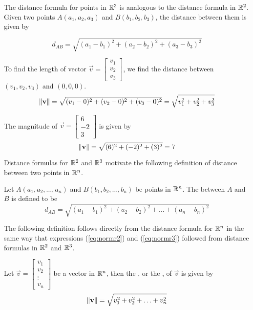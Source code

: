 \documentclass{ximera}
\begin{document}
The distance formula for points in $\mathbb{R}^3$ is analogous to the distance formula in $\mathbb{R}^2$.  Given two points $A(a_1, a_2, a_3)$ and $B(b_1, b_2, b_3)$, the distance between them is given by 

\begin{equation*}
d_{AB}=\sqrt{(a_1-b_1)^2+(a_2-b_2)^2+(a_3-b_3)^2}
\end{equation*}

To find the length of vector $\vec{v}=\begin{bmatrix}v_1\\ v_2\\ v_3\end{bmatrix}$, we find the distance between $(v_1, v_2, v_3)$ and $(0, 0, 0)$.
\begin{equation}\label{eq:normr3}
\left\lVert\mathbf{v}\right\rVert=\sqrt{(v_1-0)^2+(v_2-0)^2+(v_3-0)^2}=\sqrt{v_1^2+v_2^2+v_3^2}
\end{equation}

\begin{example}\label{ex:findmaginr3}
The magnitude of $\vec{v}=\begin{bmatrix}6\\-2\\3\end{bmatrix}$ is given by
$$
\left\lVert\mathbf{v}\right\rVert=\sqrt{(6)^2+(-2)^2+(3)^2}=7
$$
\end{example}


Distance formulas for $\mathbb{R}^2$ and $\mathbb{R}^3$ motivate the following definition of distance between two points in $\mathbb{R}^n$.

  \begin{definition}\label{def:distrn} Let $A(a_1, a_2,\ldots, a_n)$ and $B(b_1, b_2,\ldots, b_n)$ be points in $\mathbb{R}^n$.  The  between $A$ and $B$ is defined to be
\begin{equation*}
d_{AB}=\sqrt{(a_1-b_1)^2+(a_2-b_2)^2+\ldots +(a_n-b_n)^2}
\end{equation*}
\end{definition}

The following definition follows directly from the distance formula for $\mathbb{R}^n$ in the same way that expressions (\ref{eq:normr2}) and (\ref{eq:normr3}) followed from distance formulas in $\mathbb{R}^2$ and $\mathbb{R}^3$.  
\begin{definition}\label{def:normrn}
Let $\vec{v}=\begin{bmatrix}v_1\\ v_2\\ \vdots \\v_n\end{bmatrix}$ be a vector in $\mathbb{R}^n$, then the , or the , of $\vec{v}$ is given by
\begin{equation} \label{eq:normrn} 
\left\lVert\mathbf{v}\right\rVert=\sqrt{v_1^2+v_2^2+\ldots +v_n^2}
\end{equation}
\end{definition}
\end{document}
